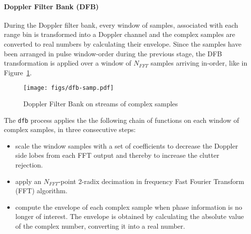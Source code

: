 \documentclass[
  a4paper,
]{article}
\let\oldparagraph\paragraph
\renewcommand{\paragraph}[1]{\oldparagraph{#1}\mbox{}}
\begin{document}
\hypertarget{sec:dfb-atom}{%
\paragraph{Doppler Filter Bank (DFB)}\label{sec:dfb-atom}}

During the Doppler filter bank, every window of samples, associated with
each range bin is transformed into a Doppler channel and the complex
samples are converted to real numbers by calculating their envelope.
Since the samples have been arranged in pulse window-order during the
previous stage, the DFB transformation is applied over a window of
\(N_{FFT}\) samples arriving in-order, like in
Figure~\ref{fig:dfb-samp}.

\begin{figure}
\hypertarget{fig:dfb-samp}{%
\centering
\texttt{[image: figs/dfb-samp.pdf]}
\caption{Doppler Filter Bank on streams of complex
samples}\label{fig:dfb-samp}
}
\end{figure}

The \texttt{dfb} process applies the the following chain of functions on
each window of complex samples, in three consecutive steps:

\begin{itemize}
\item
  scale the window samples with a set of coefficients to decrease the
  Doppler side lobes from each FFT output and thereby to increase the
  clutter rejection.
\item
  apply an \(N_{FFT}\)-point 2-radix decimation in frequency Fast
  Fourier Transform (FFT) algorithm.
\item
  compute the envelope of each complex sample when phase information is
  no longer of interest. The envelope is obtained by calculating the
  absolute value of the complex number, converting it into a real
  number.
\end{itemize}
\end{document}
